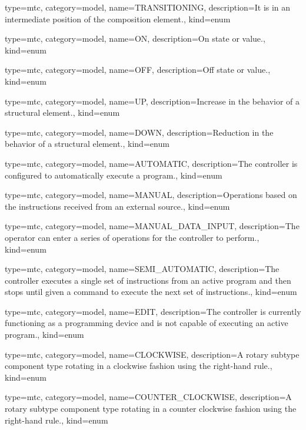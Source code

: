 {
  type=mtc,
  category=model,
  name={TRANSITIONING},
  description={It is in an intermediate position of the \gls{composition} element.},
  kind={enum}
}


{
  type=mtc,
  category=model,
  name={ON},
  description={On state or value.},
  kind={enum}
}


{
  type=mtc,
  category=model,
  name={OFF},
  description={Off state or value.},
  kind={enum}
}


{
  type=mtc,
  category=model,
  name={UP},
  description={Increase in the behavior of a \gls{structural element}.},
  kind={enum}
}


{
  type=mtc,
  category=model,
  name={DOWN},
  description={Reduction in the behavior of a \gls{structural element}.},
  kind={enum}
}


{
  type=mtc,
  category=model,
  name={AUTOMATIC},
  description={The \gls{controller} is configured to automatically execute a program.},
  kind={enum}
}


{
  type=mtc,
  category=model,
  name={MANUAL},
  description={Operations based on the instructions received from an external source.},
  kind={enum}
}


{
  type=mtc,
  category=model,
  name={MANUAL\_DATA\_INPUT},
  description={The operator can enter a series of operations for the controller to perform.},
  kind={enum}
}


{
  type=mtc,
  category=model,
  name={SEMI\_AUTOMATIC},
  description={The controller  executes a single set of instructions from an active program and then stops until given a command to execute the next set of instructions.},
  kind={enum}
}


{
  type=mtc,
  category=model,
  name={EDIT},
  description={The controller is currently functioning as a programming device and is not capable of executing an active program.},
  kind={enum}
}


{
  type=mtc,
  category=model,
  name={CLOCKWISE},
  description={A \gls{rotary subtype} component type rotating in a clockwise fashion using the right-hand rule.},
  kind={enum}
}


{
  type=mtc,
  category=model,
  name={COUNTER\_CLOCKWISE},
  description={A \gls{rotary subtype} component type rotating in a counter clockwise fashion using the right-hand rule.},
  kind={enum}
}


